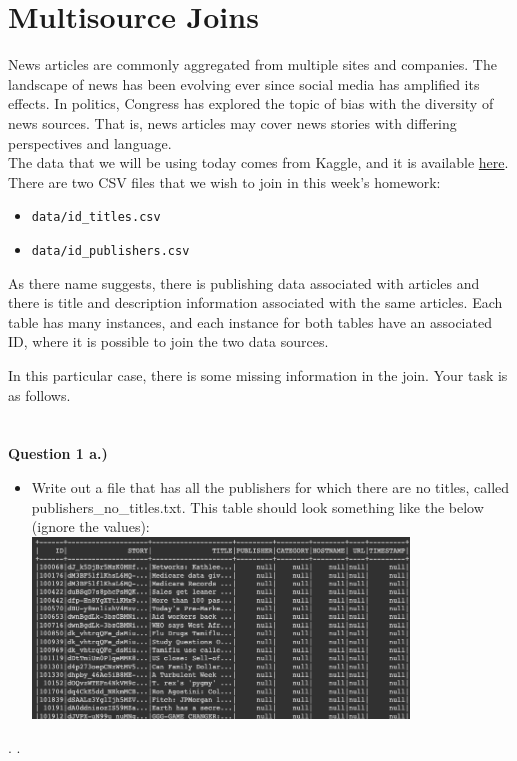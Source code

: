 \documentclass[paper=a4, fontsize=11pt]{scrartcl} %
\author{
    \textbf{YOUR NAME} \\ 
    \textbf{YOUR GIT USERNAME} \\ 
    \textbf{YOUR E-MAIL}
}%
\begin{document}
\maketitle %

\section{Multisource Joins}

News articles are commonly aggregated from multiple sites and companies. The landscape of news has been evolving ever since social media has amplified its effects. In politics, Congress has explored the topic of bias with the diversity of news sources. That is, news articles may cover news stories with differing perspectives and language. \\

The data that we will be using today comes from Kaggle, and it is available \href{https://course.ccs.neu.edu/cs6220/homework-3/}{here}. There are two CSV files that we wish to join in this week's homework:

\begin{itemize}
    \item \verb"data/id_titles.csv"
    \item \verb"data/id_publishers.csv"
\end{itemize}

As there name suggests, there is publishing data associated with articles and there is title and description information associated with the same articles. Each table has many instances, and each instance for both tables have an associated ID, where it is possible to join the two data sources.

In this particular case, there is some missing information in the join. Your task is as follows. \\
\\
\\

\textbf{Question 1 a.)}
\begin{itemize}
    \item Write out a file that has all the publishers for which there are no titles, called publishers\_no\_titles.txt. This table should look something like the below (ignore the values): \\
    \includegraphics[width=100mm]{images/pub_no_title.png}
\end{itemize} 
.
.
\\
\end{document}

